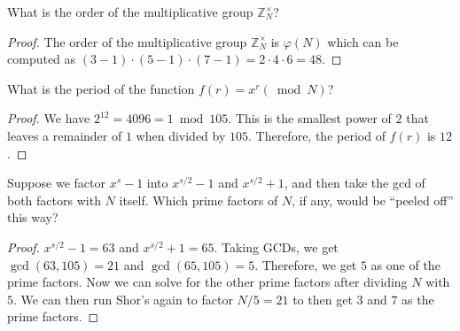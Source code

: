 \begin{solution}[label=ques:3a]
  \begin{question}
    What is the order of the multiplicative group $\mathbb{Z}_N^\times$?
  \end{question}
  \tcblower{}
  \begin{proof}
    The order of the multiplicative group $\mathbb{Z}_N^\times$ is $\varphi(N)$ which can be computed as $(3 - 1)\cdot(5 - 1)\cdot(7 - 1) = 2\cdot4\cdot6 = 48$.
  \end{proof}
\end{solution}

\begin{solution}[label=ques:3b]
  \begin{question}
    What is the period of the function $f(r)=x^r (\bmod N)$?
  \end{question}
  \tcblower{}
  \begin{proof}
    We have $2^{12} = 4096 = 1 \bmod 105$. This is the smallest power of $2$ that leaves a remainder of $1$ when divided by $105$. Therefore, the period of $f(r)$ is $12$.
  \end{proof}
\end{solution}

\begin{solution}[label=ques:3c]
  \begin{question}
    Suppose we factor $x^s-1$ into $x^{s/2}-1$ and $x^{s/2}+1$, and then take the gcd of both factors with $N$ itself.  Which prime factors of $N$, if any, would be ``peeled off'' this way?
  \end{question}
  \tcblower{}
  \begin{proof}
    $x^{s/2} - 1 = 63$ and $x^{s/2} + 1 = 65$. Taking GCDs, we get $\gcd(63, 105) = 21$ and $\gcd(65, 105) = 5$. Therefore, we get $5$ as one of the prime factors. Now we can solve for the other prime factors after dividing $N$ with $5$. We can then run Shor's again to factor $N / 5 = 21$ to then get $3$ and $7$ as the prime factors.
  \end{proof}
\end{solution}

